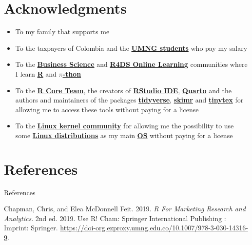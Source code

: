 \documentclass[
  ignorenonframetext,
]{beamer}
\newlength{\cslhangindent}
\newenvironment{CSLReferences}[2] %
 {\begin{list}{}{%
  \setlength{\itemindent}{0pt}
  \setlength{\leftmargin}{0pt}
  \setlength{\parsep}{0pt}
  \ifodd #1
   \setlength{\leftmargin}{\cslhangindent}
   \setlength{\itemindent}{-1\cslhangindent}
  \fi
  \setlength{\itemsep}{#2\baselineskip}}}
 {\end{list}}
\begin{document}
\section{Acknowledgments}\label{acknowledgments}

\begin{frame}{}
\label{section-36}
\begin{itemize}
\item
  To my family that supports me
\item
  To the taxpayers of Colombia and the
  \href{https://www.umng.edu.co/estudiante}{\textbf{UMNG students}} who
  pay my salary
\item
  To the \href{https://www.business-science.io/}{\textbf{Business
  Science}} and \href{https://www.rfordatasci.com/}{\textbf{R4DS Online
  Learning}} communities where I learn
  \href{https://www.r-project.org/about.html}{\textbf{R}} and
  \href{https://www.python.org/about/}{\textbf{\(\pi\)-thon}}
\item
  To the \href{https://www.r-project.org/contributors.html}{\textbf{R
  Core Team}}, the creators of
  \href{https://posit.co/products/open-source/rstudio/}{\textbf{RStudio
  IDE}}, \href{https://quarto.org/}{\textbf{Quarto}} and the authors and
  maintainers of the packages
  \href{https://CRAN.R-project.org/package=tidyverse}{\textbf{tidyverse}},
  \href{https://CRAN.R-project.org/package=skimr}{\textbf{skimr}} and
  \href{https://CRAN.R-project.org/package=tinytex}{\textbf{tinytex}}
  for allowing me to access these tools without paying for a license
\item
  To the \href{https://www.kernel.org/category/about.html}{\textbf{Linux
  kernel community}} for allowing me the possibility to use some
  \href{https://static.lwn.net/Distributions/}{\textbf{Linux
  distributions}} as my main
  \href{https://en.wikipedia.org/wiki/Operating_system}{\textbf{OS}}
  without paying for a license
\end{itemize}
\end{frame}

\section*{References}\label{references}

\begin{frame}[allowframebreaks]{References}
\label{refs}
\begin{CSLReferences}{1}{0}
Chapman, Chris, and Elea McDonnell Feit. 2019. \emph{R {For} {Marketing}
{Research} and {Analytics}}. 2nd ed. 2019. Use {R}! Cham: Springer
International Publishing : Imprint: Springer.
\url{https://doi-org.ezproxy.umng.edu.co/10.1007/978-3-030-14316-9}.

\end{CSLReferences}
\end{frame}
\end{document}

